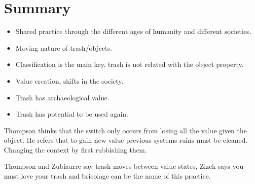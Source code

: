 \section{Summary}
\begin{itemize}
\item Shared practice through the different ages of humanity and different societies. 
\item Moving nature of trash/objects.
\item Classification is the main key, trash is not related with the object property. 
\item Value creation, shifts in the society. 
\item Trash has archaeological value.
\item Trash has potential to be used again.
\end{itemize}

Thompson thinks that the switch only occurs from losing all the value given the object. He refers that to gain new value previous systems ruins must be cleaned. Changing the context by first rubbishing them.

Thompson and Zubiaurre say trash moves between value states, Zizek says you must love your trash and bricolage can be the name of this practice.

